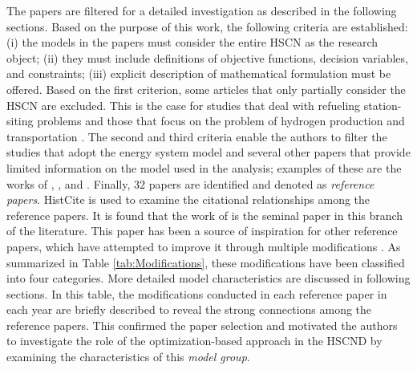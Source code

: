 \documentclass[11pt,3p]{elsarticle}
\begin{document}
The papers are filtered for a 
detailed investigation as described in the following sections. Based on the purpose of this work, the following criteria are established: (i) the models in the papers must consider the entire HSCN as the research object; (ii) they must include definitions of objective functions, decision variables, and constraints; (iii) explicit description of mathematical formulation must be offered. Based on the first criterion, some articles that only partially consider the HSCN are excluded. This is the case for studies that deal with refueling station-siting problems and those that focus on the problem of hydrogen production and transportation \citep{andre2013design,lahnaoui2018optimizing}. The second and third criteria enable the authors to filter the studies that adopt the energy system model and several other papers that provide limited information on the model used in the analysis; examples of these are the works of \citet{ball2007integration}, \citet{bique2018balancing}, \citet{hugo2005hydrogen} and \citet{li2008hydrogen}. Finally, 32 papers are identified and denoted as \textit{reference papers}. HistCite \citep{garfield2004histcite} is used to examine the citational relationships among the reference papers. It is found that the work of \citet{almansoori2006design} is the seminal paper in this branch of the literature. This paper has been a source of inspiration for other reference papers, which have attempted to improve it through multiple modifications \citep{agnolucci2013designing}. As summarized in Table \ref{tab:Modifications}, these modifications have been classified into four categories. More detailed model characteristics are discussed in following sections. In this table, the modifications conducted in each reference paper in each year are briefly described to reveal the strong connections among the reference papers. This confirmed the paper selection and motivated the authors to investigate the role of the optimization-based approach in the HSCND by examining the characteristics of this \textit{model group}.
\end{document}
